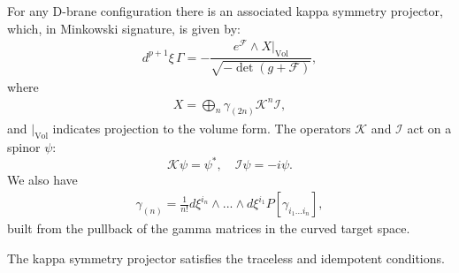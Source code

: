 For any D-brane configuration there is an associated kappa symmetry projector, which, in Minkowski signature, is given by\cite{Skenderis:2002vf}:
\begin{align}
d^{p+1} \xi \, \Gamma = - \dfrac{ e^{\mathcal{F}}\wedge X|_{\text{Vol}}}{\sqrt{-\det  (g+\mathcal{F})}},
\end{align}
where
\begin{align}
X = \bigoplus_n \gamma_{(2n)} \mathcal{K}^n \mathcal{I},
\end{align}
and $|_{\text{Vol}}$ indicates projection to the volume form.
The operators $\mathcal{K}$ and $\mathcal{I}$ act on a spinor $\psi$:
\begin{equation}
 \mathcal{K} \psi = \psi^* , \quad \mathcal{I} \psi = -i \psi.
\end{equation}
We also have
\begin{align}
\gamma_{(n)} = \frac{1}{n !}d\xi^{i_n}\wedge ... \wedge d\xi^{i_1} P[\gamma_{i_1...i_n}],
\end{align}
built from the pullback of the gamma matrices in the curved target space. 

The kappa symmetry projector satisfies the traceless and idempotent conditions.


